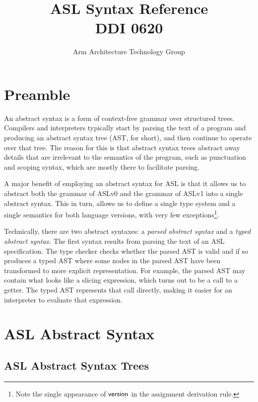 \documentclass{book}
\author{Arm Architecture Technology Group}
\title{ASL Syntax Reference \\
       DDI 0620}
\begin{document}
\maketitle

\tableofcontents{}





\chapter{Preamble}
An abstract syntax is a form of context-free grammar over structured trees. Compilers and interpreters typically start by parsing the text of a program and producing an abstract syntax tree (AST, for short), and then continue to operate over that tree.
%
The reason for this is that abstract syntax trees abstract away details that are irrelevant to the semantics of the program, such as punctuation and scoping syntax, which are mostly there to facilitate parsing.

A major benefit of employing an abstract syntax for ASL is that it allows us to abstract both the grammar of ASLv0 and the grammar of ASLv1 into a single abstract syntax. This in turn, allows us to define a single type system and a single semantics for both language versions, with very few exceptions\footnote{Note the single appearance of $\textsf{version}$ in the assignment derivation rule.}.

Technically, there are two abstract syntaxes:
a \emph{parsed abstract syntax} and a \emph{typed abstract syntax}.
The first syntax results from parsing the text of an ASL specification.
The type checker checks whether the parsed AST is valid and if so produces
a typed AST where some nodes in the parsed AST have been transformed to
more explicit representation. For example, the parsed AST may contain
what looks like a slicing expression, which turns out to be a call to a getter.
The typed AST represents that call directly, making it easier for an interpreter
to evaluate that expression.

\chapter{ASL Abstract Syntax}

\section{ASL Abstract Syntax Trees}
\end{document}
